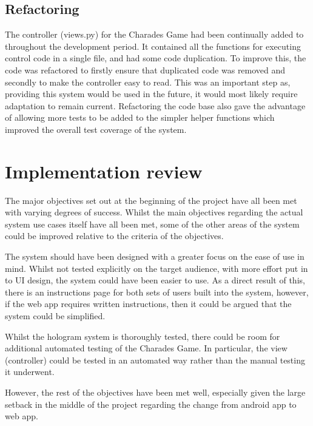 \subsection{Refactoring}
The controller (views.py) for the Charades Game had been continually added to throughout the development period. It contained all the functions for executing control code in a single file, and had some code duplication. To improve this, the code was refactored to firstly ensure that duplicated code was removed and secondly to make the controller easy to read. This was an important step as, providing this system would be used in the future, it would most likely require adaptation to remain current. Refactoring the code base also gave the advantage of allowing more tests to be added to the simpler helper functions which improved the overall test coverage of the system.

\newpage

\section{Implementation review}
The major objectives set out at the beginning of the project have all been met with varying degrees of success. Whilst the main objectives regarding the actual system use cases itself have all been met, some of the other areas of the system could be improved relative to the criteria of the objectives. 

The system should have been designed with a greater focus on the ease of use in mind. Whilst not tested explicitly on the target audience, with more effort put in to UI design, the system could have been easier to use. As a direct result of this, there is an instructions page for both sets of users built into the system, however, if the web app requires written instructions, then it could be argued that the system could be simplified.

Whilst the hologram system is thoroughly tested, there could be room for additional automated testing of the Charades Game. In particular, the view (controller) could be tested in an automated way rather than the manual testing it underwent.

However, the rest of the objectives have been met well, especially given the large setback in the middle of the project regarding the change from android app to web app.
